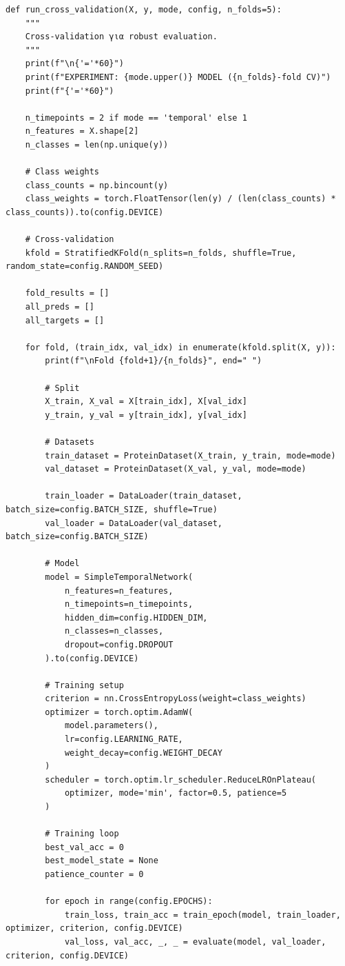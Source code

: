 \begin{lstlisting}
def run_cross_validation(X, y, mode, config, n_folds=5):
    """
    Cross-validation για robust evaluation.
    """
    print(f"\n{'='*60}")
    print(f"EXPERIMENT: {mode.upper()} MODEL ({n_folds}-fold CV)")
    print(f"{'='*60}")
 
    n_timepoints = 2 if mode == 'temporal' else 1
    n_features = X.shape[2]
    n_classes = len(np.unique(y))
 
    # Class weights
    class_counts = np.bincount(y)
    class_weights = torch.FloatTensor(len(y) / (len(class_counts) * class_counts)).to(config.DEVICE)
 
    # Cross-validation
    kfold = StratifiedKFold(n_splits=n_folds, shuffle=True, random_state=config.RANDOM_SEED)
 
    fold_results = []
    all_preds = []
    all_targets = []
 
    for fold, (train_idx, val_idx) in enumerate(kfold.split(X, y)):
        print(f"\nFold {fold+1}/{n_folds}", end=" ")
 
        # Split
        X_train, X_val = X[train_idx], X[val_idx]
        y_train, y_val = y[train_idx], y[val_idx]
 
        # Datasets
        train_dataset = ProteinDataset(X_train, y_train, mode=mode)
        val_dataset = ProteinDataset(X_val, y_val, mode=mode)
 
        train_loader = DataLoader(train_dataset, batch_size=config.BATCH_SIZE, shuffle=True)
        val_loader = DataLoader(val_dataset, batch_size=config.BATCH_SIZE)
 
        # Model
        model = SimpleTemporalNetwork(
            n_features=n_features,
            n_timepoints=n_timepoints,
            hidden_dim=config.HIDDEN_DIM,
            n_classes=n_classes,
            dropout=config.DROPOUT
        ).to(config.DEVICE)
 
        # Training setup
        criterion = nn.CrossEntropyLoss(weight=class_weights)
        optimizer = torch.optim.AdamW(
            model.parameters(),
            lr=config.LEARNING_RATE,
            weight_decay=config.WEIGHT_DECAY
        )
        scheduler = torch.optim.lr_scheduler.ReduceLROnPlateau(
            optimizer, mode='min', factor=0.5, patience=5
        )
 
        # Training loop
        best_val_acc = 0
        best_model_state = None
        patience_counter = 0
 
        for epoch in range(config.EPOCHS):
            train_loss, train_acc = train_epoch(model, train_loader, optimizer, criterion, config.DEVICE)
            val_loss, val_acc, _, _ = evaluate(model, val_loader, criterion, config.DEVICE)
 

\end{lstlisting}
